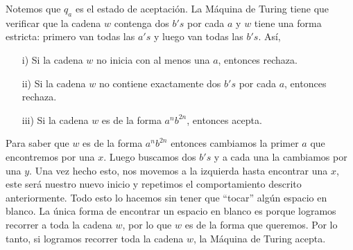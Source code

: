 \documentclass[letterpaper,10pt]{article}
\begin{document}
\begin{enumerate}
\begin{itemize}
\begin{figure}[ht]
\begin{tikzpicture}[->,>=stealth',shorten >=1pt,auto,node
                  distance=3.0cm, semithick]
                \end{tikzpicture}
            
            \end{figure}
            
            Notemos que $q_a$ es el estado de aceptación. La Máquina de Turing 
            tiene que verificar que la cadena $w$ contenga dos $b's$ por cada
            $a$ y $w$ tiene una forma estricta: primero van todas las $a's$ y 
            luego van todas las $b's$. Así, 
            \begin{itemize}
                \item[i)] Si la cadena $w$ no inicia con al menos una $a$,
               entonces rechaza.
                \item[ii)] Si la cadena $w$ no contiene exactamente dos $b's$
               por cada $a$, entonces rechaza.
               \item[iii)] Si la cadena $w$ es de la forma $a^{n}b^{2n}$, 
               entonces acepta.
            \end{itemize}
            
            Para saber que $w$ es de la forma $a^{n}b^{2n}$ entonces
            cambiamos la primer $a$ que encontremos por una $x$. Luego
            buscamos dos $b's$ y a cada una la cambiamos por una $y$. Una
            vez hecho esto, nos movemos a la izquierda hasta encontrar una $x$, 
            este será nuestro nuevo inicio y repetimos el comportamiento
            descrito anteriormente. Todo esto lo hacemos sin tener que ``tocar''
            algún espacio en blanco. La única forma de encontrar un espacio
            en blanco es porque logramos recorrer a toda la cadena $w$, por lo
            que $w$ es de la forma que queremos. Por lo tanto, si logramos
            recorrer toda la cadena $w$, la Máquina de Turing acepta.
           

\end{itemize}
\end{enumerate}
\end{document}
